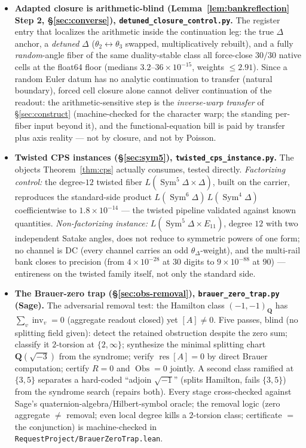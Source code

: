 \documentclass[11pt]{article}
\theoremstyle{definition}
\newcommand{\Sym}{\operatorname{Sym}}
\begin{document}
\begin{itemize}
\item \textbf{Adapted closure is arithmetic-blind (Lemma~\ref{lem:bankreflection} Step 2,
\S\ref{sec:converse}), \texttt{detuned\_closure\_control.py}.} The register entry that localizes the
arithmetic inside the continuation leg: the true $\Delta$ anchor, a \emph{detuned} $\Delta$
($\theta_2\leftrightarrow\theta_3$ swapped, multiplicatively rebuilt), and a fully \emph{random}-angle fiber
of the same duality-stable class all force-close $30/30$ native cells at the float64 floor (medians
$3.2$--$36\times10^{-15}$, weights $\le2.91$). Since a random Euler datum has no analytic continuation to
transfer (natural boundary), forced cell closure alone cannot deliver continuation of the readout: the
arithmetic-sensitive step is the \emph{inverse-warp transfer} of \S\ref{sec:construct} (machine-checked for
the character warp; the standing per-fiber input beyond it), and the functional-equation bill is paid by
transfer plus axis reality --- not by closure, and not by Poisson.

\item \textbf{Twisted CPS instances (\S\ref{sec:sym5}), \texttt{twisted\_cps\_instance.py}.} The objects
Theorem~\ref{thm:cps} actually consumes, tested directly. \emph{Factorizing control:} the degree-$12$ twisted
fiber $L(\Sym^5\Delta\times\Delta)$, built on the carrier, reproduces the standard-side product
$L(\Sym^6\Delta)\,L(\Sym^4\Delta)$ coefficientwise to $1.8\times10^{-14}$ --- the twisted pipeline validated
against known quantities. \emph{Non-factorizing instance:} $L(\Sym^5\Delta\times E_{11})$, degree $12$ with two
independent Satake angles, does not reduce to symmetric powers of one form; no channel is DC (every channel
carries an odd $\theta_\Delta$-weight), and the multi-rail bank closes to precision (from $4\times10^{-28}$ at
$30$ digits to $9\times10^{-88}$ at $90$) --- entireness on the twisted family itself, not only the standard side.

\item \textbf{The Brauer-zero trap (\S\ref{sec:obs-removal}), \texttt{brauer\_zero\_trap.py} (Sage).} The
adversarial removal test: the Hamilton class $(-1,-1)_{\mathbf Q}$ has $\sum_v\operatorname{inv}_v=0$ (aggregate
readout closed) yet $[A]\neq0$. Five passes, blind (no splitting field given): detect the retained obstruction
despite the zero sum; classify it $2$-torsion at $\{2,\infty\}$; synthesize the minimal splitting chart
$\mathbf Q(\sqrt{-3})$ from the syndrome; verify $\operatorname{res}[A]=0$ by direct Brauer computation; certify
$R{=}0$ and $\operatorname{Obs}{=}0$ jointly. A second class ramified at $\{3,5\}$ separates a hard-coded
``adjoin $\sqrt{-1}$'' (splits Hamilton, fails $\{3,5\}$) from the syndrome search (repairs both). Every stage
cross-checked against Sage's quaternion-algebra/Hilbert-symbol oracle; the removal logic (zero aggregate $\ne$ removal; even local degree kills a $2$-torsion class; certificate $=$ the conjunction) is machine-checked in \texttt{RequestProject/BrauerZeroTrap.lean}.


\end{itemize}
\end{document}
